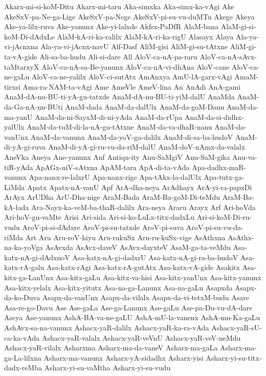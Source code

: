 {Akarx-mi-si-koM-Ditu
Akarx-mi-taru
Aka-simxka
Aka-simx-ka-vAgi
Ake
AkeSxV-pa-Ne-ga-Lige
AkeSxV-pa-Nege
AkeSxV-pi-su-vu-duMTu
Akege
Akeya
Ake-ya-lilx-ruva
Ake-yanunx
Ake-yi-lalxde
Akfsx-PaDfR
AlaM-bana
AlaM-gi-si-koM-Di-dAdxLe
AlaM-kA-ri-ka-ralilx
AlaM-kA-ri-ka-rigU
Alasayx
Alaya
Ala-ya-vi-jAcnxna
Ala-ya-vi-jAcnx-navU
Alf-Dasf
AliM-gisi
AliM-gi-su-tAtxne
AliM-gi-ta-vA-gide
Ali-sa-ba-hudu
Ali-si-dare
All
AloV-ca-nA-pa-raru
AloV-ca-nA-sAvx-taMtarxyX
AloV-ca-nA-sa-Be-yanunx
AloV-ca-nA-vi-dhAna
AloV-cane
AloV-ca-ne-gaLu
AloV-ca-ne-yalilx
AloV-ci-sutAtx
AmAnxya
AmU-lA-garx-vAgi
AmaM-tirxsi
Ama-ra-NAM-ta-vAgi
Ame
AmeVle
AmeV-lina
An
AnAdi
AnA-gami
AnaM-dA-nu-BU-ti-yA-gu-tatxde
AnaM-dA-nu-BU-ti-yiM-dalU
AnaMda
AnaM-da-Ga-nA-nu-BUti
AnaM-dada
AnaM-da-dalUlx
AnaM-da-goM-Danu
AnaM-da-ma-yanU
AnaM-da-ni-SayxM-di-ni-yAda
AnaM-da-rUpa
AnaM-da-si-didhx-yalUlx
AnaM-da-tuM-di-la-nA-gu-tAtxne
AnaM-da-va-dhaR-nanu
AnaM-da-vanUnx
AnaM-da-vanunx
AnaM-da-yoV-ga-dalilx
AnaM-di-sa-ba-hudoV
AnaM-di-yA-gi-ruva
AnaM-di-yA-gi-ru-vu-da-riM-dalU
AnaM-doV-nAmx-da-valalx
AneVka
Aneya
Ane-yanunx
Anf
Antiqu-ity
Anu-SaMgiV
Anu-SaM-gika
Anu-va-tiR-yAda
ApAGx-niV-sAtxna
ApAM-tara
ApA-di-ta-vAda
Apa-dadhx-maR-vanunx
Apa-nanx-re-lalxrU
Apa-nanx-rige
Apa-tAkx-la-dalUlx
Apa-tutx-ga-LiMda
Apatx
Apatx-nA-vanU
Apf
ArA-dha-neya
ArAdhayx
ArA-yi-ra-papxDi
ArAyx
ArUDha
ArU-Dha-nige
AraM-Bada
AraM-Ba-goM-Di-teMdu
AraM-Ba-kA-lada
Ara-Nayx-ka-veM-ba-thaR-dalilx
Ara-neya
Araru
Arayx
Arf
Ari-hoVda
Ari-hoV-gu-vaMte
Arisi
Ari-sida
Ari-si-ko-LuLx-titx-dadxLu
Ari-si-koM-Di-ru-vudu
AroV-pi-si-dAdxre
AroV-pi-su-tatxde
AroV-pi-suva
AroV-pi-su-vu-da-riMda
Art
Aru
Aru-roV-hiyu
Aru-rukuSx
Aru-ru-kuSx-vige
AsAthxna
AsAthx-na-ka-yoVga
AsAvxda
AsAvx-daveV
AsAvx-dayxteV
AsaM-ga-ta-veMdu
Asa-katx-nA-gi-dAdxnoV
Asa-katx-nA-gi-dadxrU
Asa-katx-nA-gi-ra-ba-hudoV
Asa-katx-rA-galu
Asa-katx-rAgi
Asa-katx-rA-gutAtx
Asa-katx-vA-gide
Asakitx
Asa-kitx-ga-LanUnx
Asa-kitx-gaLu
Asa-kitx-va-hisi
Asa-kitx-yanUnx
Asa-kitx-yanunx
Asa-kitx-yelalx
Asa-kitx-yitutx
Asa-na-ga-Lanunx
Asa-na-gaLu
Asapxda
Asapx-da-ko-Duva
Asapx-da-vanUnx
Asapx-da-vilalx
Asapx-da-vi-tetxM-budu
Asare
Asa-re-go-Davu
Ase
Ase-gaLa
Ase-ga-Lanunx
Ase-gaLu
Ase-pa-Du-vu-dA-dare
Aseya
Ase-yanunx
AshA-BA-va-ne-gaLU
AshA-mU-la-vanenx
AshA-mu-Ka-gaLu
AshAvx-sa-na-vanunx
Ashacx-yaR-dalilx
Ashacx-yaR-ka-ra-vAda
Ashacx-yaR-sU-ca-ka-vAda
Ashacx-yaR-valalx
Ashacx-yaR-veVnU
Ashacx-yaR-veV-neMdu
Ashacx-yaR-vilalx
Asharxma
Asharx-ma-da-vaneV
Asharx-ma-gaLa
Asharx-ma-ga-La-lilxna
Asharx-ma-vanunx
Asharx-yA-sidadhx
Asharx-yisi
Asharx-yi-su-titx-dadx-reMba
Asharx-yi-su-vaMtha
Asharx-yi-su-vudu
}
